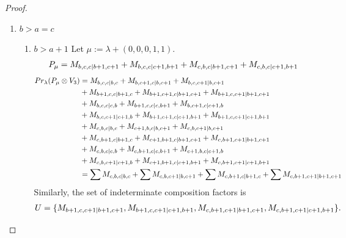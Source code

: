 \begin{proof}
\begin{enumerate}
  \item $b>a=c$
    \begin{enumerate}
      \item $b>a+1$
        Let $\mu:=\lambda + (0,0,0,1,1) $.
        \begin{equation}\notag
          \begin{aligned}
            P_\mu = M_{b,c,c|b+1,c+1}
+ M_{b,c,c|c+1,b+1}
+ M_{c,b,c|b+1,c+1}
+ M_{c,b,c|c+1,b+1}
          \end{aligned}
        \end{equation}
        \begin{equation}\notag
          \begin{aligned}
            Pr_{\lambda}(P_\mu \otimes V_{3}) &=
M_{b,c,c|b,c}
+ M_{b,c+1,c|b,c+1}
+ M_{b,c,c+1|b,c+1}\\
                                            &
+ M_{b+1,c,c|b+1,c}
+ M_{b+1,c+1,c|b+1,c+1}
+ M_{b+1,c,c+1|b+1,c+1}\\
                                            &
+ M_{b,c,c|c,b}
+ M_{b+1,c,c|c,b+1}
+ M_{b,c+1,c|c+1,b}\\
                                            &
+ M_{b,c,c+1|c+1,b}
+ M_{b+1,c+1,c|c+1,b+1}
+ M_{b+1,c,c+1|c+1,b+1}\\
                                            &
+ M_{c,b,c|b,c}
+ M_{c+1,b,c|b,c+1}
+ M_{c,b,c+1|b,c+1}\\
                                            &
+ M_{c,b+1,c|b+1,c}
+ M_{c+1,b+1,c|b+1,c+1}
+ M_{c,b+1,c+1|b+1,c+1}\\
                                            &
+ M_{c,b,c|c,b}
+ M_{c,b+1,c|c,b+1}
+ M_{c+1,b,c|c+1,b}\\
                                            &
+ M_{c,b,c+1|c+1,b}
+ M_{c+1,b+1,c|c+1,b+1}
+ M_{c,b+1,c+1|c+1,b+1} \\
                                               &=
\sum M_{c,b,c|b,c}
 +\sum M_{c,b,c+1|b,c+1}
 +\sum M_{c,b+1,c|b+1,c}
 +\sum M_{c,b+1,c+1|b+1,c+1}
          \end{aligned}
        \end{equation}
      Similarly, the set of indeterminate composition factors is 
\begin{equation}\notag
  \begin{aligned}
    U = \{
M_{b+1,c,c+1|b+1,c+1},
M_{b+1,c,c+1|c+1,b+1},
M_{c,b+1,c+1|b+1,c+1},
M_{c,b+1,c+1|c+1,b+1}
\}.
  \end{aligned}
\end{equation}

\end{enumerate}
\end{enumerate}
\end{proof}

